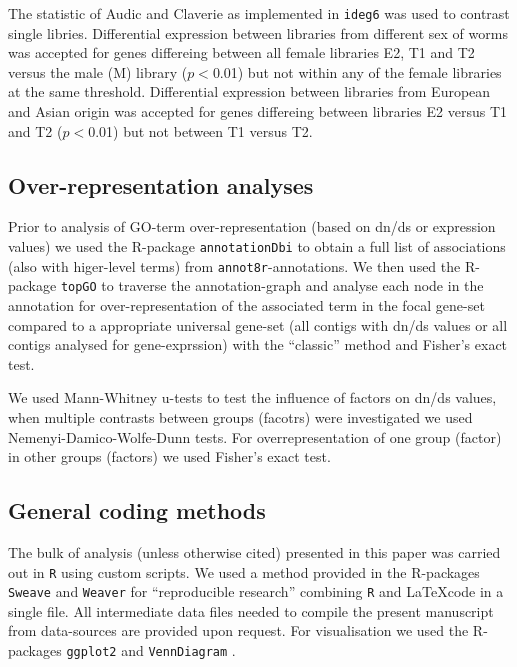 \documentclass[10pt]{bmc_article}
\newenvironment{bmcformat}{\begin{raggedright}\baselineskip20pt\sloppy\setboolean{publ}{false}}{\end{raggedright}\baselineskip20pt\sloppy}
\begin{document}
\begin{bmcformat}

The statistic of Audic and Claverie \cite{pmid9331369} as implemented
in \texttt{ideg6} \cite{pmid12429865} was used to contrast single
libries. Differential expression between libraries from different sex
of worms was accepted for genes differeing between all female
libraries E2, T1 and T2 versus the male (M) library ($p<$0.01) but not
within any of the female libraries at the same threshold. Differential
expression between libraries from European and Asian origin was
accepted for genes differeing between libraries E2 versus T1 and T2
($p<$0.01) but not between T1 versus T2.

\subsection*{Over-representation analyses}

Prior to analysis of GO-term over-representation (based on dn/ds or
expression values) we used the R-package \texttt{annotationDbi}
\cite{AnnotationDbi} to obtain a full list of associations (also with
higer-level terms) from \texttt{annot8r}-annotations. We then used the
R-package \texttt{topGO} \cite{topGO} to traverse the annotation-graph
and analyse each node in the annotation for over-representation of the
associated term in the focal gene-set compared to a appropriate
universal gene-set (all contigs with dn/ds values or all contigs
analysed for gene-exprssion) with the ``classic'' method and Fisher's
exact test.

We used Mann-Whitney u-tests to test the influence of factors on dn/ds
values, when multiple contrasts between groups (facotrs) were
investigated we used Nemenyi-Damico-Wolfe-Dunn tests. For
overrepresentation of one group (factor) in other groups (factors) we
used Fisher's exact test.

\subsection*{General coding methods}

The bulk of analysis (unless otherwise cited) presented in this paper
was carried out in \texttt{R} \cite{R_project} using custom
scripts. We used a method provided in the R-packages \texttt{Sweave}
\cite{lmucs-papers:Leisch:2002} and \texttt{Weaver} \cite{weaver} for
``reproducible research'' combining \texttt{R} and \LaTeX code in a
single file. All intermediate data files needed to compile the present
manuscript from data-sources are provided upon request. For
visualisation we used the R-packages \texttt{ggplot2}
\cite{ggplot-book} and \texttt{VennDiagram} \cite{pmid21269502}.



\end{bmcformat}
\end{document}
